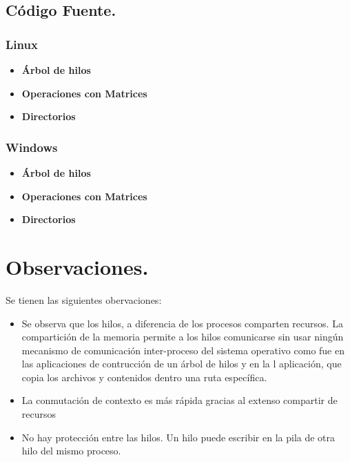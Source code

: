 \documentclass[12pt]{article}
\begin{document}
\newpage
\subsection{Código Fuente.}
   \subsubsection{Linux}
   
    \begin{itemize}
       \item \textbf{Árbol de hilos}
         
        \item \textbf{Operaciones con Matrices}
        
        \item \textbf{Directorios}
         
   \end{itemize}
        
   \subsubsection{Windows}
   \begin{itemize}
       \item \textbf{Árbol de hilos}
       
        \item \textbf{Operaciones con Matrices}
         
        \item \textbf{Directorios}
        
   \end{itemize}

\section{Observaciones.}

Se tienen las siguientes obervaciones: 
 \begin{itemize}
    \item Se observa que los hilos, a diferencia de los procesos comparten recursos. La compartición de la memoria permite a los hilos  comunicarse sin usar ningún mecanismo de comunicación inter-proceso del sistema operativo como fue en las aplicaciones de contrucción de un árbol de hilos y en la l aplicación, que copia los archivos y contenidos dentro una ruta específica.
    \item La conmutación de contexto es más rápida gracias al extenso compartir de recursos
    \item No hay protección entre las hilos. Un hilo puede escribir en la pila de otra hilo del mismo proceso.
 
 \end{itemize}
\end{document}
